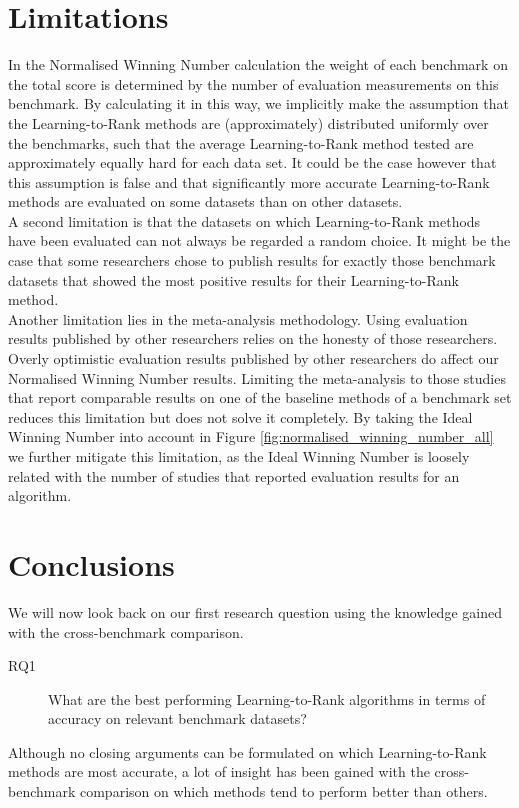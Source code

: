 \documentclass{sig-alternate-2013}
\begin{document}
\section{Limitations}
In the Normalised Winning Number calculation the weight of each benchmark on the total score is determined by the number of evaluation measurements on this benchmark. By calculating it in this way, we implicitly make the assumption that the Learning-to-Rank methods are (approximately) distributed uniformly over the benchmarks, such that the average Learning-to-Rank method tested are approximately equally hard for each data set. It could be the case however that this assumption is false and that significantly more accurate Learning-to-Rank methods are evaluated on some datasets than on other datasets. \\

A second limitation is that the datasets on which Learning-to-Rank methods have been evaluated can not always be regarded a random choice. It might be the case that some researchers chose to publish results for exactly those benchmark datasets that showed the most positive results for their Learning-to-Rank method.\\

Another limitation lies in the meta-analysis methodology. Using evaluation results published by other researchers relies on the honesty of those researchers. Overly optimistic evaluation results published by other researchers do affect our Normalised Winning Number results. Limiting the meta-analysis to those studies that report comparable results on one of the baseline methods of a benchmark set reduces this limitation but does not solve it completely. By taking the Ideal Winning Number into account in Figure \ref{fig:normalised_winning_number_all} we further mitigate this limitation, as the Ideal Winning Number is loosely related with the number of studies that reported evaluation results for an algorithm.

\section{Conclusions}
We will now look back on our first research question using the knowledge gained with the cross-benchmark comparison.
\begin{description}
\item[RQ1] What are the best performing Learning-to-Rank algorithms in terms of accuracy on relevant benchmark datasets?\\
\end{description}
Although no closing arguments can be formulated on which Learning-to-Rank methods are most accurate, a lot of insight has been gained with the cross-benchmark comparison on which methods tend to perform better than others.\\
\end{document}
